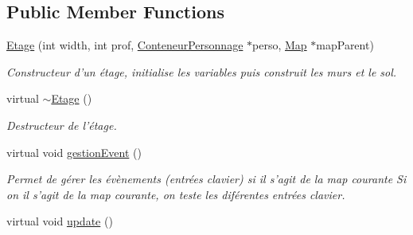 \subsection*{Public Member Functions}
\begin{DoxyCompactItemize}
\item 
\hyperlink{classEtage_a7a79b57ba18c2657e6a44d7737466217}{Etage} (int width, int prof, \hyperlink{classConteneurPersonnage}{Conteneur\-Personnage} $\ast$perso, \hyperlink{classMap}{Map} $\ast$map\-Parent)
\begin{DoxyCompactList}\small\item\em Constructeur d'un étage, initialise les variables puis construit les murs et le sol. \end{DoxyCompactList}\item 
\hypertarget{classEtage_a372b6a1b5b5f0ebf48e62b09352d239a}{virtual \hyperlink{classEtage_a372b6a1b5b5f0ebf48e62b09352d239a}{$\sim$\-Etage} ()}\label{classEtage_a372b6a1b5b5f0ebf48e62b09352d239a}

\begin{DoxyCompactList}\small\item\em Destructeur de l'étage. \end{DoxyCompactList}\item 
\hypertarget{classEtage_a167e0cb0115c2c17ed3f84c61655f21f}{virtual void \hyperlink{classEtage_a167e0cb0115c2c17ed3f84c61655f21f}{gestion\-Event} ()}\label{classEtage_a167e0cb0115c2c17ed3f84c61655f21f}

\begin{DoxyCompactList}\small\item\em Permet de gérer les évènements (entrées clavier) si il s'agit de la map courante Si on il s'agit de la map courante, on teste les diférentes entrées clavier. \end{DoxyCompactList}\item 
\hypertarget{classEtage_a0a7144190ad633923a0e312e24063386}{virtual void \hyperlink{classEtage_a0a7144190ad633923a0e312e24063386}{update} ()}\label{classEtage_a0a7144190ad633923a0e312e24063386}


\end{DoxyCompactItemize}
